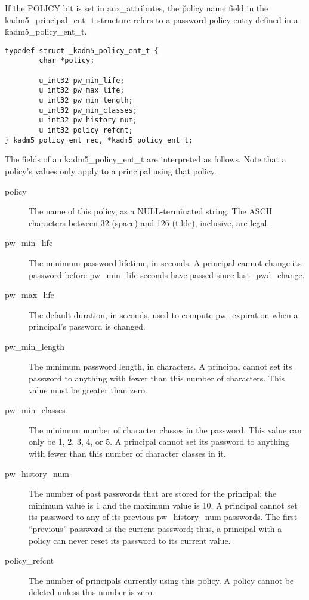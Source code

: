 If the POLICY bit is set in aux_attributes, the \v{policy} name field
in the kadm5_principal_ent_t structure refers to a password policy
entry defined in a \v{kadm5_policy_ent_t}.

\begin{verbatim}
typedef struct _kadm5_policy_ent_t {
        char *policy;

        u_int32 pw_min_life;
        u_int32 pw_max_life;
        u_int32 pw_min_length;
        u_int32 pw_min_classes;
        u_int32 pw_history_num;
        u_int32 policy_refcnt;
} kadm5_policy_ent_rec, *kadm5_policy_ent_t;
\end{verbatim}

The fields of an kadm5_policy_ent_t are interpreted as follows.
Note that a policy's values only apply to a principal using that
policy.

\begin{description}
\item[policy] The name of this policy, as a NULL-terminated string.
The ASCII characters between 32 (space) and 126 (tilde), inclusive,
are legal.

\item[pw_min_life] The minimum password lifetime, in seconds.
A principal cannot change its password before pw_min_life seconds have
passed since last_pwd_change.

\item[pw_max_life] The default duration, in seconds, used to compute
pw_expiration when a principal's password is changed.

\item[pw_min_length] The minimum password length, in characters.  A
principal cannot set its password to anything with fewer than this
number of characters.  This value must be greater than zero.

\item[pw_min_classes] The minimum number of character classes in the
password.  This value can only be 1, 2, 3, 4, or 5.  A principal cannot
set its password to anything with fewer than this number of character
classes in it.

\item[pw_history_num] The number of past passwords that are
stored for the principal; the minimum value is 1 and the maximum value
is 10.  A principal cannot set its password to any of its previous
pw_history_num passwords.  The first ``previous'' password is the
current password; thus, a principal with a policy can never reset its
password to its current value.

\item[policy_refcnt]  The number of principals currently using this policy.
A policy cannot be deleted unless this number is zero.
\end{description}

